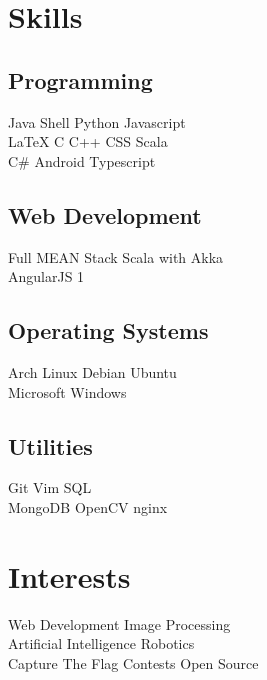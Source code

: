 \documentclass[]{deedy-resume-openfont}
\begin{document}
\begin{minipage}[t]{0.33\textwidth}

\section{Skills}
\subsection{Programming}
Java \textbullet{}   Shell \textbullet{} Python \textbullet{} Javascript \\
\LaTeX{} \textbullet{} C \textbullet{} C++ \textbullet{} CSS \textbullet{} Scala \\
C\# \textbullet{} Android \textbullet{} Typescript
\subsection{Web Development}
Full MEAN Stack \textbullet{} Scala with Akka \\
AngularJS 1
\subsection{Operating Systems}
Arch Linux \textbullet{} Debian \textbullet{} Ubuntu \\
Microsoft Windows
\subsection{Utilities}
Git \textbullet{} Vim \textbullet{} SQL \\
MongoDB \textbullet{} OpenCV \textbullet{} nginx \\


\section{Interests}
Web Development \textbullet{} Image Processing \\
Artificial Intelligence \textbullet{} Robotics \\
Capture The Flag Contests \textbullet{} Open Source
%
%

\end{minipage} 
\hfill
\end{document}
